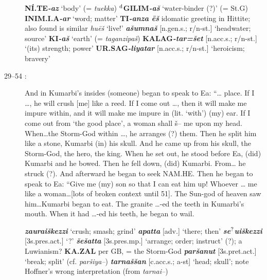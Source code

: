 \documentclass[10pt]{article}
\newcommand{\supersc}[1]{$^{\textrm{\scriptsize{#1}}}$}  	%
\newcommand{\bit}[1]{\textbf{\textit{#1}}}				%
\newcommand{\p}[1]{{\tiny[{#1}]}}					%
\newcommand{\hith}{\textsubwedge{h}}
\newcommand{\Hith}{\textsubwedge{H}}
\renewcommand{\.}[1]{\textsubdot{#1}}
\begin{document}
\begin{description}
\begin{notes}
 
\textbf{N\'I.TE}\bit{-az} `body' (= \textit{tuekka}) \textbf{\supersc{d}GILIM}\bit{-a\v{s}} `water-binder (?)' (= St.G) \textbf{INIM.{\Hith}I.A}\bit{-ar} `word; matter' \textbf{TI}\bit{-anza \=e\v{s}} idomatic greeting in Hittite; also found is similar \textit{hu\=e\v{s}} `live!' \bit{{\hith}a\v{s}umna\v{s}} \p{n.gen.s.; r/n-st.} `headwater; source' \textbf{KI}\bit{-a\v{s}} `earth' (= \textit{taganzipa\v{s}}) \textbf{KALAG}\bit{-tar=\v{s}et} \p{n.acc.s.; r/n-st.} `(its) strength; power' \textbf{UR.SAG}\bit{-liyatar} \p{n.acc.s.; r/n-st.} `heroicism; bravery'


\end{notes}

\item[29--54 :] And in Kumarbi's insides (someone) began to speak to Ea: ``{\ldots} place. If I {\ldots}, he will crush [me] like a reed. If I come out {\ldots}, then it will make me impure within, and it will make me impure in (lit. `with') (my) ear. If I come out from `the good place', a woman shall \v{s}-- me upon my head. When{\ldots}the Storm-God within {\ldots}, he arranges (?) them. Then he split him like a stone, Kumarbi (in) his skull. And he came up from his skull, the Storm-God, the hero, the king. When he set out, he stood before Ea, (did) Kumarbi and he bowed. Then he fell down, (did) Kumarbi. From{\ldots} he struck (?). And afterward he began to seek NAM.HE. Then he began to speak to Ea: ``Give me (my) son so that I can eat him up! Whoever {\ldots} me like a woman{\ldots}[lots of broken context until 51]. The Sun-god of heaven saw him{\ldots}Kumarbi began to eat. The granite {\ldots}-ed the teeth in Kumarbi's mouth. When it had {\ldots}-ed his teeth, he began to wail.


\begin{notes}

\bit{za{\hith\hith}urai\v{s}kezzi} `crush; smash; grind' \bit{apatta} \p{adv.} `there; then' \bit{se\supersc{?}{\hith}ui\v{s}kezzi} \p{3s.pres.act.} `?' \bit{\v{s}e\v{s}{\hith}atta} \p{3s.pres.mp.} `arrange; order; instruct' (?); a Luwianism? \textbf{KA.ZAL} per GB, = the Storm-God \bit{par\v{s}anut} \p{3s.pret.act.} `break; split' (cf. \textit{par\v{s}iya--}) \bit{tarna\v{s}\v{s}an} \p{c.acc.s.; a-st} `head; skull'; note Hoffner's wrong interpretation (from \textit{tarnai--})



\end{notes}
\end{description}
\end{document}
